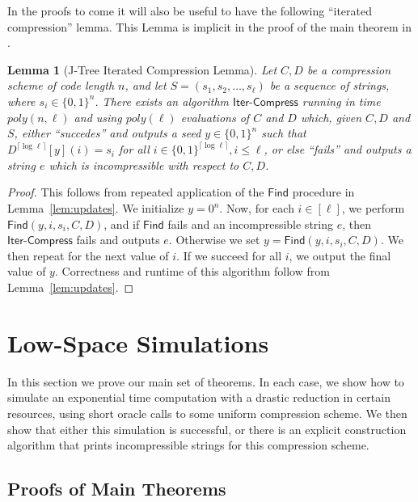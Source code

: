 \documentclass[11pt]{article}
\newtheorem{lemma}{Lemma}
\newcommand{\dash}{\text{-}}
\newcommand{\B}{\{0,1\}}
\begin{document}
In the proofs to come it will also be useful to have the following ``iterated compression'' lemma. This Lemma is implicit in the proof of the main theorem in \cite{Korten}.
\begin{lemma}[J-Tree Iterated Compression Lemma]\label{lem:compress}
 Let $C,D$ be a compression scheme of code length $n$, and let $S = (s_1, s_2, \ldots, s_{\ell})$ be a sequence of strings, where $s_i \in \B^n$. There exists an algorithm $\mathsf{Iter\dash Compress}$ running in time $poly(n,\ell)$ and using $poly(\ell)$ evaluations of $C$ and $D$ which, given $C,D$ and $S$, either ``succedes'' and outputs a seed $y \in \B^n$ such that $D^{\lceil \log \ell \rceil}[y](i) = s_i$ for all $i \in \B^{\lceil \log \ell \rceil}, i \leq \ell$, or else ``fails'' and outputs a string $e$ which is incompressible with respect to $C,D$.
\end{lemma}
\begin{proof}
This follows from repeated application of the $\mathsf{Find}$ procedure in Lemma~\ref{lem:updates}. We initialize $y=0^n$. Now, for each $i \in [\ell]$, we perform $\mathsf{Find}(y,i,s_i,C,D)$, and if $\mathsf{Find}$ fails and an incompressible string $e$, then $\mathsf{Iter\dash Compress}$ fails and outputs $e$. Otherwise we set $y = \mathsf{Find}(y,i,s_i,C,D)$. We then repeat for the next value of $i$. If we succeed for all $i$, we output the final value of $y$. Correctness and runtime of this algorithm follow from Lemma~\ref{lem:updates}.
\end{proof}

\section{Low-Space Simulations}\label{sec:low-space}
In this section we prove our main set of theorems. In each case, we show how to simulate an exponential time computation with a drastic reduction in certain resources, using short oracle calls to some uniform compression scheme. We then show that either this simulation is successful, or there is an explicit construction algorithm that prints incompressible strings for this compression scheme.


\subsection{Proofs of Main Theorems}\label{subsec:main-proofs}
\end{document}
